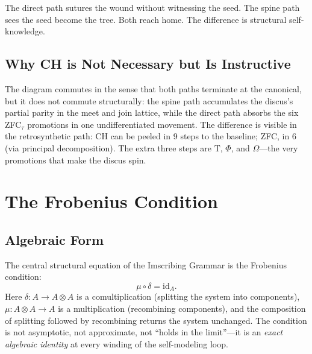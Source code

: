 \documentclass[12pt,twoside]{book}
\theoremstyle{definition}
\newcommand{\ZFCt}{\text{ZFC}_{\tau}}
\newcommand{\prim}[1]{\text{#1}}
\begin{document}
The direct path sutures the wound without witnessing the seed. The spine path sees the seed become the tree. Both reach home. The difference is structural self-knowledge.

\section{Why CH is Not Necessary but Is Instructive}

\begin{center}
\end{center}

The diagram commutes in the sense that both paths terminate at the canonical, but it does not commute structurally: the spine path accumulates the discus's partial parity in the meet and join lattice, while the direct path absorbs the six ZFC$_{\tau}$ promotions in one undifferentiated movement. The difference is visible in the retrosynthetic path: CH can be peeled in 9 steps to the baseline; ZFC, in 6 (via principal decomposition). The extra three steps are $\prim{T}$, $\Phi$, and $\Omega$---the very promotions that make the discus spin.%
\chapter{The Frobenius Condition}

\section{Algebraic Form}

The central structural equation of the Imscribing Grammar is the Frobenius condition:
\begin{equation}
\mu \circ \delta = \text{id}_A.
\end{equation}
Here $\delta: A \to A \otimes A$ is a comultiplication (splitting the system into components), $\mu: A \otimes A \to A$ is a multiplication (recombining components), and the composition of splitting followed by recombining returns the system unchanged. The condition is not asymptotic, not approximate, not ``holds in the limit''---it is an \emph{exact algebraic identity} at every winding of the self-modeling loop.
\end{document}
